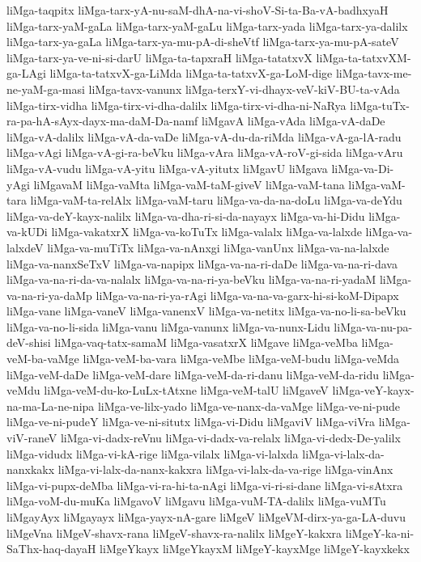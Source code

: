 {liMga-taqpitx
liMga-tarx-yA-nu-saM-dhA-na-vi-shoV-Si-ta-Ba-vA-badhxyaH
liMga-tarx-yaM-gaLa
liMga-tarx-yaM-gaLu
liMga-tarx-yada
liMga-tarx-ya-dalilx
liMga-tarx-ya-gaLa
liMga-tarx-ya-mu-pA-di-sheVtf
liMga-tarx-ya-mu-pA-sateV
liMga-tarx-ya-ve-ni-si-darU
liMga-ta-tapxraH
liMga-tatatxvX
liMga-ta-tatxvXM-ga-LAgi
liMga-ta-tatxvX-ga-LiMda
liMga-ta-tatxvX-ga-LoM-dige
liMga-tavx-me-ne-yaM-ga-masi
liMga-tavx-vanunx
liMga-terxY-vi-dhayx-veV-kiV-BU-ta-vAda
liMga-tirx-vidha
liMga-tirx-vi-dha-dalilx
liMga-tirx-vi-dha-ni-NaRya
liMga-tuTx-ra-pa-hA-sAyx-dayx-ma-daM-Da-namf
liMgavA
liMga-vAda
liMga-vA-daDe
liMga-vA-dalilx
liMga-vA-da-vaDe
liMga-vA-du-da-riMda
liMga-vA-ga-lA-radu
liMga-vAgi
liMga-vA-gi-ra-beVku
liMga-vAra
liMga-vA-roV-gi-sida
liMga-vAru
liMga-vA-vudu
liMga-vA-yitu
liMga-vA-yitutx
liMgavU
liMgava
liMga-va-Di-yAgi
liMgavaM
liMga-vaMta
liMga-vaM-taM-giveV
liMga-vaM-tana
liMga-vaM-tara
liMga-vaM-ta-relAlx
liMga-vaM-taru
liMga-va-da-na-doLu
liMga-va-deYdu
liMga-va-deY-kayx-nalilx
liMga-va-dha-ri-si-da-nayayx
liMga-va-hi-Didu
liMga-va-kUDi
liMga-vakatxrX
liMga-va-koTuTx
liMga-valalx
liMga-va-lalxde
liMga-va-lalxdeV
liMga-va-muTiTx
liMga-va-nAnxgi
liMga-vanUnx
liMga-va-na-lalxde
liMga-va-nanxSeTxV
liMga-va-napipx
liMga-va-na-ri-daDe
liMga-va-na-ri-dava
liMga-va-na-ri-da-va-nalalx
liMga-va-na-ri-ya-beVku
liMga-va-na-ri-yadaM
liMga-va-na-ri-ya-daMp
liMga-va-na-ri-ya-rAgi
liMga-va-na-va-garx-hi-si-koM-Dipapx
liMga-vane
liMga-vaneV
liMga-vanenxV
liMga-va-netitx
liMga-va-no-li-sa-beVku
liMga-va-no-li-sida
liMga-vanu
liMga-vanunx
liMga-va-nunx-Lidu
liMga-va-nu-pa-deV-shisi
liMga-vaq-tatx-samaM
liMga-vasatxrX
liMgave
liMga-veMba
liMga-veM-ba-vaMge
liMga-veM-ba-vara
liMga-veMbe
liMga-veM-budu
liMga-veMda
liMga-veM-daDe
liMga-veM-dare
liMga-veM-da-ri-danu
liMga-veM-da-ridu
liMga-veMdu
liMga-veM-du-ko-LuLx-tAtxne
liMga-veM-talU
liMgaveV
liMga-veY-kayx-na-ma-La-ne-nipa
liMga-ve-lilx-yado
liMga-ve-nanx-da-vaMge
liMga-ve-ni-pude
liMga-ve-ni-pudeY
liMga-ve-ni-situtx
liMga-vi-Didu
liMgaviV
liMga-viVra
liMga-viV-raneV
liMga-vi-dadx-reVnu
liMga-vi-dadx-va-relalx
liMga-vi-dedx-De-yalilx
liMga-vidudx
liMga-vi-kA-rige
liMga-vilalx
liMga-vi-lalxda
liMga-vi-lalx-da-nanxkakx
liMga-vi-lalx-da-nanx-kakxra
liMga-vi-lalx-da-va-rige
liMga-vinAnx
liMga-vi-pupx-deMba
liMga-vi-ra-hi-ta-nAgi
liMga-vi-ri-si-dane
liMga-vi-sAtxra
liMga-voM-du-muKa
liMgavoV
liMgavu
liMga-vuM-TA-dalilx
liMga-vuMTu
liMgayAyx
liMgayayx
liMga-yayx-nA-gare
liMgeV
liMgeVM-dirx-ya-ga-LA-duvu
liMgeVna
liMgeV-shavx-rana
liMgeV-shavx-ra-nalilx
liMgeY-kakxra
liMgeY-ka-ni-SaThx-haq-dayaH
liMgeYkayx
liMgeYkayxM
liMgeY-kayxMge
liMgeY-kayxkekx
}
